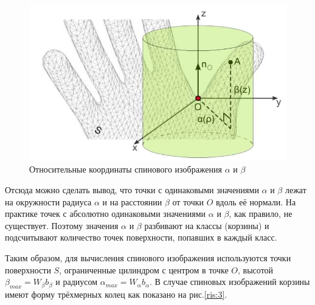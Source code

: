 \documentclass[14pt]{article}
\numberwithin{figure}{section}
\numberwithin{equation}{section}
\begin{document}
\begin{figure}[h]
	\begin{center}
		\includegraphics[scale=0.9]{2.JPG}
		\caption{Относительные координаты спинового изображения $\alpha$ и $\beta$}
		\label{ris:2}
	\end{center}
\end{figure}

Отсюда можно сделать вывод, что точки с одинаковыми значениями $\alpha$ и $\beta$ лежат на окружности радиуса $\alpha$ и на расстоянии $\beta$ от точки $O$ вдоль её нормали. На практике точек с абсолютно одинаковыми значениями $\alpha$ и $\beta$, как правило, не существует. Поэтому значения $\alpha$ и $\beta$ разбивают на классы (корзины) и подсчитывают количество точек поверхности, попавших в каждый класс.

Таким образом, для вычисления спинового изображения используются точки поверхности $S$, ограниченные цилиндром с центром в точке $O$, высотой $\beta_{max} = W_{\beta}b_{\beta}$ и радиусом $\alpha_{max} = W_{\alpha} b_{\alpha}$. В случае спиновых изображений корзины имеют форму трёхмерных колец как показано на рис.\ref{ris:3}.
\end{document}
